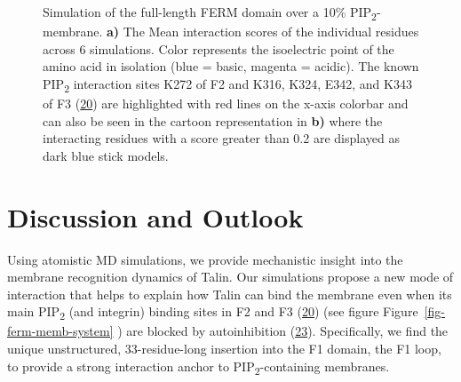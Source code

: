 \documentclass[
  twocolumn]{biophys-new-mod}
\begin{document}
\begin{figure}
\begin{minipage}[t]{\linewidth}
{}

\subcaption{\label{fig-ferm-memb-system}~}
\end{minipage}%

\caption{\label{fig-ferm-further}Simulation of the full-length FERM
domain over a 10\% PIP\textsubscript{2}-membrane. \textbf{a)} The Mean
interaction scores of the individual residues across 6 simulations.
Color represents the isoelectric point of the amino acid in isolation
(blue = basic, magenta = acidic). The known PIP\textsubscript{2}
interaction sites K272 of F2 and K316, K324, E342, and K343 of F3
(\protect\hyperlink{ref-chinthalapudiInteractionTalinCell2018a}{20}) are
highlighted with red lines on the x-axis colorbar and can also be seen
in the cartoon representation in \textbf{b)} where the interacting
residues with a score greater than 0.2 are displayed as dark blue stick
models.}

\end{figure}

\hypertarget{discussion-and-outlook}{%
\section{Discussion and Outlook}\label{discussion-and-outlook}}

Using atomistic MD simulations, we provide mechanistic insight into the
membrane recognition dynamics of Talin. Our simulations propose a new
mode of interaction that helps to explain how Talin can bind the
membrane even when its main PIP\textsubscript{2} (and integrin) binding
sites in F2 and F3
(\protect\hyperlink{ref-chinthalapudiInteractionTalinCell2018a}{20})
(see figure Figure~\ref{fig-ferm-memb-system} ) are blocked by
autoinhibition
(\protect\hyperlink{ref-deddenArchitectureTalin1Reveals2019a}{23}).
Specifically, we find the unique unstructured, 33-residue-long insertion
into the F1 domain, the F1 loop, to provide a strong interaction anchor
to PIP\textsubscript{2}-containing membranes.
\end{document}
